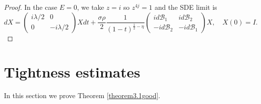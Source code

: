 \documentclass[12pt, reqno]{amsart}
\theoremstyle{definition}
\theoremstyle{remark}
\numberwithin{equation}{section}
\begin{document}
\begin{proof}
In the case $E=0$, we take $z=i$ so $z^{4j}=1$ and the SDE limit is
\begin{equation}
    dX=\begin{pmatrix} i\lambda/2&0\\0&-i\lambda/2\end{pmatrix} X dt+\frac{\sigma\rho}{2}\frac{1}{(1-t)^{\frac{1}{2}-\eta}}\begin{pmatrix}
        id\mathcal{B}_1& id\mathcal{B}_2\\-id\mathcal{B}_2&-id\mathcal{B}_1 \end{pmatrix} X,\quad X(0)=I.
\end{equation}
\end{proof}




\section{Tightness estimates}\label{section3}


In this section we prove Theorem \ref{theorem3.1good}.
\end{document}
